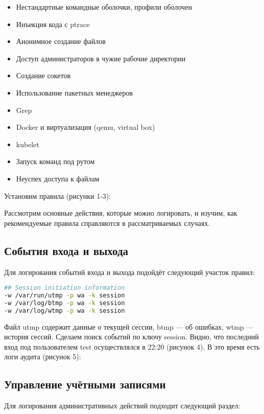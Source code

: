 \begin{itemize}
    \item Нестандартные командные оболочки, профили оболочен 
    \item Инъекция кода с ptrace
    \item Анонимное создание файлов
    \item Доступ администраторов в чужие рабочие директории 
    \item Создание сокетов
    \item Использование пакетных менеджеров
    \item Grep
    \item Docker и виртуализация (qemu, virtual box)
    \item kubelet
    \item Запуск команд под рутом
    \item Неуспех доступа к файлам
\end{itemize}

Установим правила (рисунки 1-3):
\FloatBarrier

\FloatBarrier

\FloatBarrier

Рассмотрим основные действия, которые можно логировать, и изучим, как рекомендуемые правила справляются в рассматриваемых случаях.

\subsection{События входа и выхода}
Для логирования событий входа и выхода подойдёт следующий участок правил:

\begin{lstlisting}[language=bash, numbers=none, caption={События входа и выхода}]
## Session initiation information
-w /var/run/utmp -p wa -k session
-w /var/log/btmp -p wa -k session
-w /var/log/wtmp -p wa -k session
\end{lstlisting}

Файл utmp содержит данные о текущей сессии, btmp — об ошибках, wtmp — история сессий. Сделаем поиск событий по ключу session. Видно, что последний вход под пользователем test осуществлялся в 22:20 (рисунок 4). В это время есть логи аудита (рисунок 5):

\FloatBarrier

\FloatBarrier


\subsection{Управление учётными записями}
Для логирования административных действий подходит следующий раздел:


